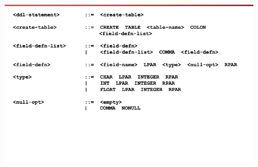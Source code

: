 \documentclass[
	12pt, %
]{fphw}
\begin{document}
\begin{figure}[H]
  \centering
  \includegraphics[scale=0.7]{images/bnf6.png}
\end{figure}

\end{document}
